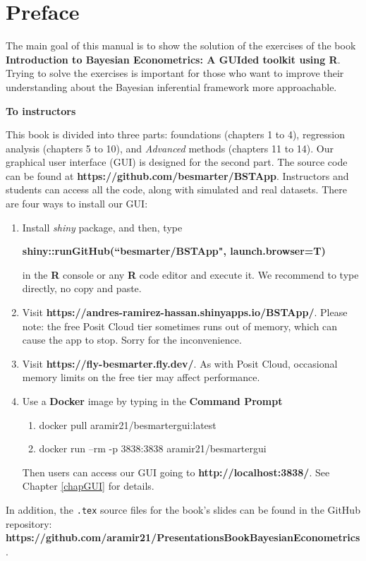 \chapter*{Preface}
The main goal of this manual is to show the solution of the exercises of the book \textbf{Introduction to Bayesian Econometrics: A GUIded toolkit using R}. Trying to solve the exercises is important for those who want to improve their understanding about the Bayesian inferential framework more approachable.

\textbf{To instructors}

This book is divided into three parts: foundations (chapters 1 to 4), regression analysis (chapters 5 to 10), and \textit{Advanced} methods (chapters 11 to 14). Our graphical user interface (GUI) is designed for the second part. The source code can be found at \textbf{https://github.com/besmarter/BSTApp}. Instructors and students can access all the code, along with simulated and real datasets. There are four ways to install our GUI:

\begin{enumerate}
	\item Install \textit{shiny} package, and then, type
	
	\textbf{shiny::runGitHub(``besmarter/BSTApp", launch.browser=T)} 
	
	in the \textbf{R} console or any \textbf{R} code editor and execute it. We recommend to type directly, no copy and paste.
	\item Visit \textbf{https://andres-ramirez-hassan.shinyapps.io/BSTApp/}. Please note: the free Posit Cloud tier sometimes runs out of memory, which can cause the app to stop. Sorry for the inconvenience.
	\item Visit \textbf{https://fly-besmarter.fly.dev/}. As with Posit Cloud, occasional memory limits on the free tier may affect performance.
	\item Use a \textbf{Docker} image by typing in the \textbf{Command Prompt}
	\begin{enumerate}
		\item docker pull aramir21/besmartergui:latest
		\item docker run --rm -p 3838:3838 aramir21/besmartergui
	\end{enumerate}
	Then users can access our GUI going to \textbf{http://localhost:3838/}. See Chapter \ref{chapGUI} for details.
\end{enumerate}

In addition, the \texttt{.tex} source files for the book's slides can be found in the GitHub repository:\\
\textbf{https://github.com/aramir21/PresentationsBookBayesianEconometrics}. 

